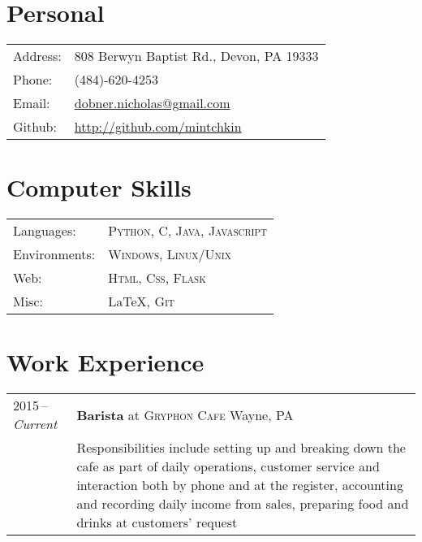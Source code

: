 \documentclass[a4paper,10pt]{article}
\begin{document}
\pagestyle{empty} %

\newfontfamily{} %

\par{\bigskip\par}

\section{Personal}
\begin{tabular}{@{}>{\raggedleft\arraybackslash}m{6.5em}l}
    Address:   & 808 Berwyn Baptist Rd., Devon, PA 19333 \\
    Phone:     & (484)-620-4253 \\
    Email:     & \href{mailto:dobner.nicholas@gmail.com}{dobner.nicholas@gmail.com} \\
    Github:    & \href{https://github.com/mintchkin}{http://github.com/mintchkin}
\end{tabular}

\section{Computer Skills}
\begin{tabular}{@{}>{\raggedleft\arraybackslash}m{6.5em}l}
    Languages:      & \textsc{Python}, \textsc{C}, \textsc{Java}, \textsc{Javascript} \\
    Environments:   & \textsc{Windows}, \textsc{Linux/Unix} \\
    Web:            & \textsc{Html}, \textsc{Css}, \textsc{Flask} \\
    Misc:           & {\LaTeX}, \textsc{Git}
\end{tabular}

\section{Work Experience}
\begin{tabularx}{\textwidth}{@{}p{6em}|X@{}}
    2015\,--\,\emph{Current} & \textbf{Barista} at \textsc{Gryphon Cafe} \hfill Wayne, PA \\
    & \footnotesize{Responsibilities include setting up and breaking down the cafe as part of daily operations, customer service and interaction both by phone and at the register, accounting and recording daily income from sales, preparing food and drinks at customers' request} \\
\end{tabularx}
\end{document}
